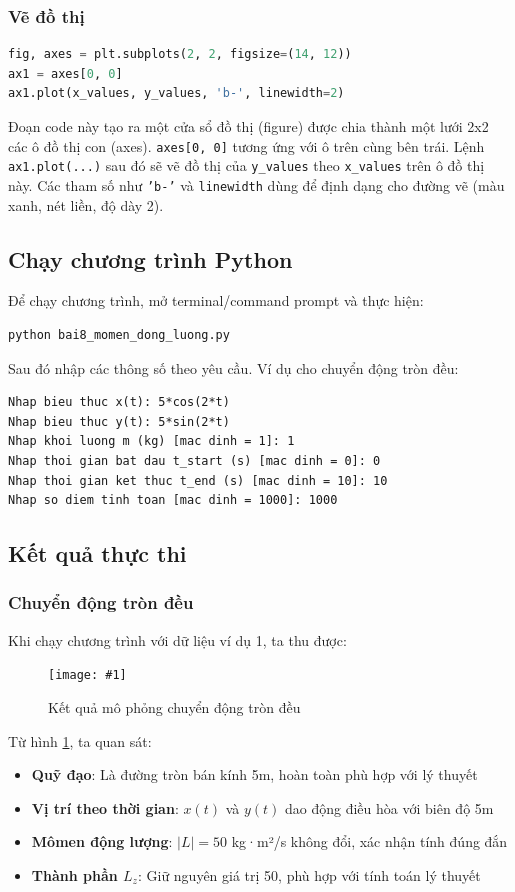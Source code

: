 \documentclass{report}
\newcommand{\insertimage}[3]{%
    \begin{figure}[!htbp]
        \centering
        \texttt{[image: \#1]}
        \caption{#3}
        \label{fig:#1}
    \end{figure}
}
\newcounter{line}
\begin{document}
\subsubsection{Vẽ đồ thị}
\begin{lstlisting}[language=Python, caption=Vẽ đồ thị]
fig, axes = plt.subplots(2, 2, figsize=(14, 12))
ax1 = axes[0, 0]
ax1.plot(x_values, y_values, 'b-', linewidth=2)
\end{lstlisting}
\justifying Đoạn code này tạo ra một cửa sổ đồ thị (figure) được chia thành một lưới 2x2 các ô đồ thị con (axes). \texttt{axes[0, 0]} tương ứng với ô trên cùng bên trái. Lệnh \texttt{ax1.plot(...)} sau đó sẽ vẽ đồ thị của \texttt{y\_values} theo \texttt{x\_values} trên ô đồ thị này. Các tham số như \texttt{'b-'} và \texttt{linewidth} dùng để định dạng cho đường vẽ (màu xanh, nét liền, độ dày 2).

\subsection{Chạy chương trình Python}
\justifying Để chạy chương trình, mở terminal/command prompt và thực hiện:

\begin{lstlisting}[language=bash]
python bai8_momen_dong_luong.py
\end{lstlisting}

Sau đó nhập các thông số theo yêu cầu. Ví dụ cho chuyển động tròn đều:

\begin{lstlisting}
Nhap bieu thuc x(t): 5*cos(2*t)
Nhap bieu thuc y(t): 5*sin(2*t)
Nhap khoi luong m (kg) [mac dinh = 1]: 1
Nhap thoi gian bat dau t_start (s) [mac dinh = 0]: 0
Nhap thoi gian ket thuc t_end (s) [mac dinh = 10]: 10
Nhap so diem tinh toan [mac dinh = 1000]: 1000
\end{lstlisting}

\subsection{Kết quả thực thi}

\subsubsection{Chuyển động tròn đều}
Khi chạy chương trình với dữ liệu ví dụ 1, ta thu được:

\insertimage{pictures/vi_du_1_chuyen_dong_tron}{0.95}{Kết quả mô phỏng chuyển động tròn đều}

Từ hình \ref{fig:pictures/vi_du_1_chuyen_dong_tron}, ta quan sát:
\begin{itemize}
    \item \textbf{Quỹ đạo}: Là đường tròn bán kính 5m, hoàn toàn phù hợp với lý thuyết
    \item \textbf{Vị trí theo thời gian}: $x(t)$ và $y(t)$ dao động điều hòa với biên độ 5m
    \item \textbf{Mômen động lượng}: $|L| = 50$ kg·m²/s không đổi, xác nhận tính đúng đắn
    \item \textbf{Thành phần $L_z$}: Giữ nguyên giá trị 50, phù hợp với tính toán lý thuyết
\end{itemize}
\end{document}
